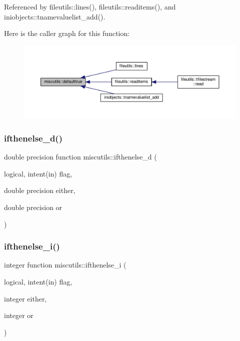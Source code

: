 Referenced by fileutils\+::lines(), fileutils\+::readitems(), and iniobjects\+::tnamevaluelist\+\_\+add().

Here is the caller graph for this function\+:
\nopagebreak
\begin{figure}[H]
\begin{center}
\leavevmode
\includegraphics[width=350pt]{namespacemiscutils_a3e4e42b3e3f4fbf064bb2e2b927c5604_icgraph}
\end{center}
\end{figure}
\mbox{\label{namespacemiscutils_ae082d895d28505b733d2171cb6482378}} 
\subsubsection{\texorpdfstring{ifthenelse\+\_\+d()}{ifthenelse\_d()}}
{\footnotesize\ttfamily double precision function miscutils\+::ifthenelse\+\_\+d (\begin{DoxyParamCaption}\item[{logical, intent(in)}]{flag,  }\item[{double precision}]{either,  }\item[{double precision}]{or }\end{DoxyParamCaption})}

\mbox{\label{namespacemiscutils_ab0ad194bb45d05df1ffbf495275ff730}} 
\subsubsection{\texorpdfstring{ifthenelse\+\_\+i()}{ifthenelse\_i()}}
{\footnotesize\ttfamily integer function miscutils\+::ifthenelse\+\_\+i (\begin{DoxyParamCaption}\item[{logical, intent(in)}]{flag,  }\item[{integer}]{either,  }\item[{integer}]{or }\end{DoxyParamCaption})}

